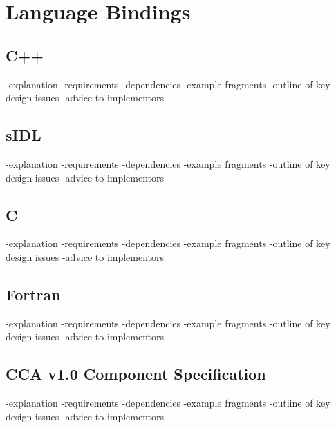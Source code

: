 \chapter{Language Bindings}

\section{C++}

-explanation
-requirements
-dependencies
-example fragments
-outline of key design issues
-advice to implementors

\section{sIDL}

-explanation
-requirements
-dependencies
-example fragments
-outline of key design issues
-advice to implementors

\section{C}

-explanation
-requirements
-dependencies
-example fragments
-outline of key design issues
-advice to implementors

\section{Fortran}

-explanation
-requirements
-dependencies
-example fragments
-outline of key design issues
-advice to implementors

\section{CCA v1.0 Component Specification}

-explanation
-requirements
-dependencies
-example fragments
-outline of key design issues
-advice to implementors
